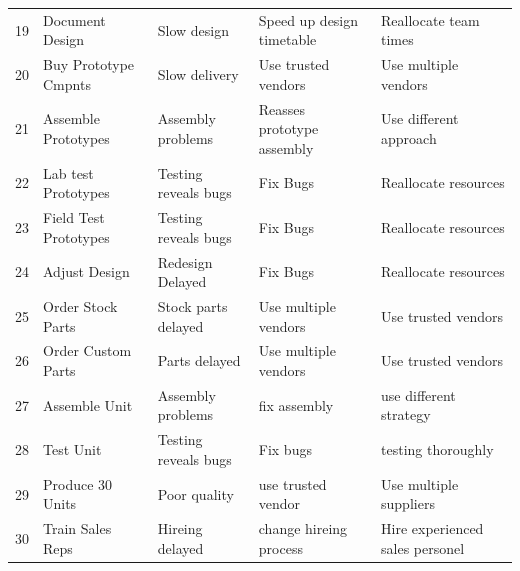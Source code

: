 \documentclass{article}
\begin{document}
\begin{table}[H]
\begin{tabular}{lllll}
19       & Document Design               & Slow design                                                     & Speed up design timetable                                            & Reallocate team times                                                 \\
20       & Buy Prototype Cmpnts  & Slow delivery                                                   & Use trusted vendors                                                  & Use multiple vendors                                                  \\
21       & Assemble Prototypes           & Assembly problems                                   & Reasses prototype assembly                                           & Use different approach                                      \\
22       & Lab test Prototypes           & Testing reveals bugs                                         & Fix Bugs                                                             & Reallocate resources         \\
23       & Field Test Prototypes         & Testing reveals bugs                                         & Fix Bugs                                                             & Reallocate resources                       \\
24       & Adjust Design                 & Redesign Delayed                                                & Fix Bugs                                                             & Reallocate resources                         \\
25       & Order Stock Parts             & Stock parts delayed                                             & Use multiple vendors                                                 & Use trusted vendors                                                   \\
26       & Order Custom Parts            & Parts delayed                                            & Use multiple vendors                                                 & Use trusted vendors                                                   \\
27       & Assemble Unit & Assembly problems                                    & fix assembly                     & use different strategy              \\
28       & Test Unit                     & Testing reveals bugs                                         & Fix bugs & testing thoroughly                                         \\
29       & Produce 30 Units              & Poor quality                            & use trusted vendor                                      & Use multiple suppliers                                                \\
30       & Train Sales Reps   & Hireing delayed                           & change hireing process         & Hire experienced sales personel               
\end{tabular}
\end{table}
\end{document}
